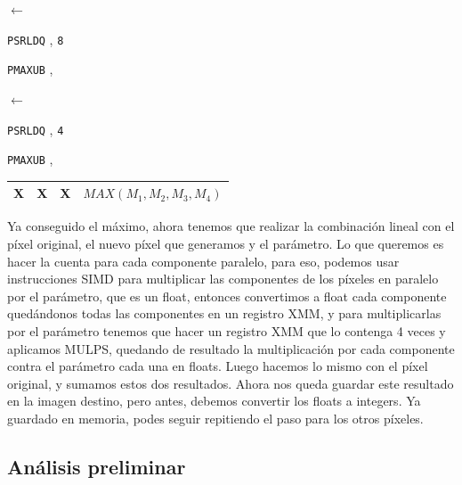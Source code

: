 \begin{center}
	 

	 $\leftarrow$ 

	\texttt{PSRLDQ} , \texttt{8} \hfill

	 

	\texttt{PMAXUB} ,  \hfill

	 

	 $\leftarrow$ 

	\texttt{PSRLDQ} , \texttt{4} \hfill

	 

	\texttt{PMAXUB} ,  \hfill

	\vspace{0.1cm}
	\begin{tabular}{|C{1cm}|C{1cm}|C{1cm}|C{3.8cm}|}\hline
		X & X & X & $MAX(M_1,M_2,M_3,M_4)$ \\ \hline
	\end{tabular}
	\vspace{0.1cm}
\end{center}

Ya conseguido el máximo, ahora tenemos que realizar la combinación lineal con el píxel original, el nuevo píxel que generamos y el parámetro. Lo que queremos es hacer la cuenta para cada componente paralelo, para eso, podemos usar instrucciones SIMD para multiplicar las componentes de los píxeles en paralelo por el parámetro, que es un float, entonces convertimos a float cada componente quedándonos todas las componentes en un registro XMM, y para multiplicarlas por el parámetro tenemos que hacer un registro XMM que lo contenga 4 veces y aplicamos MULPS, quedando de resultado la multiplicación por cada componente contra el parámetro cada una en floats. Luego hacemos lo mismo con el píxel original, y sumamos estos dos resultados. Ahora nos queda guardar este resultado en la imagen destino, pero antes, debemos convertir los floats a integers. Ya guardado en memoria, podes seguir repitiendo el paso para los otros píxeles.

\subsection{Análisis preliminar}


